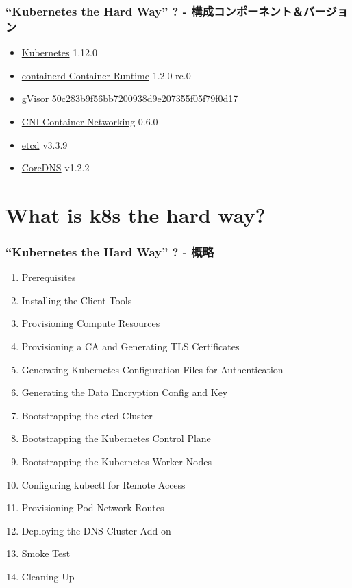 \documentclass[aspectratio=169,11pt,hyperref={colorlinks=true}]{beamer}
\begin{document}
\begin{frame}
  \frametitle{``Kubernetes the Hard Way'' ? - 構成コンポーネント＆バージョン}
  \begin{itemize}
    \item \href{https://github.com/kubernetes/kubernetes}{Kubernetes} 1.12.0
    \item \href{https://github.com/containerd/containerd}{containerd Container Runtime} 1.2.0-rc.0
    \item \href{https://github.com/google/gvisor}{gVisor} 50c283b9f56bb7200938d9e207355f05f79f0d17
    \item \href{https://github.com/containernetworking/cni}{CNI Container Networking} 0.6.0
    \item \href{https://github.com/etcd-io/etcd}{etcd} v3.3.9
    \item \href{https://github.com/coredns/coredns}{CoreDNS} v1.2.2

  \end{itemize}
\end{frame}


\section{What is k8s the hard way?}
\begin{frame}
  \frametitle{``Kubernetes the Hard Way'' ? - 概略}
  \begin{enumerate}
    \item Prerequisites
    \item Installing the Client Tools
    \item Provisioning Compute Resources
    \item Provisioning a CA and Generating TLS Certificates
    \item Generating Kubernetes Configuration Files for Authentication
    \item Generating the Data Encryption Config and Key
    \item Bootstrapping the etcd Cluster
    \item Bootstrapping the Kubernetes Control Plane
    \item Bootstrapping the Kubernetes Worker Nodes
    \item Configuring kubectl for Remote Access
    \item Provisioning Pod Network Routes
    \item Deploying the DNS Cluster Add-on
    \item Smoke Test
    \item Cleaning Up
  \end{enumerate}
\end{frame}
\end{document}
